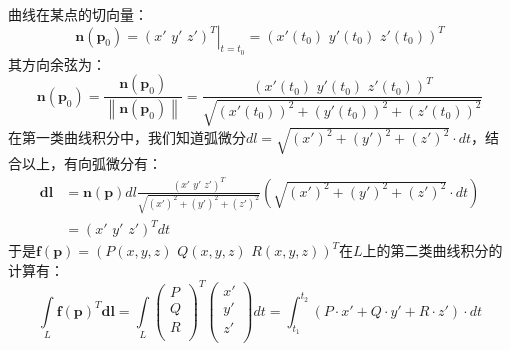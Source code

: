 \begin{theorem}[第二类曲线积分的计算公式]
曲线在某点的切向量：
\[
\boldsymbol{n}\left( \boldsymbol{p}_0 \right) =\left. \left( x'\,\,y'\,\,z' \right) ^T \right|_{t=t_0}=\left( x'\left( t_0 \right) \,\,y'\left( t_0 \right) \,\,z'\left( t_0 \right) \right) ^T
\]
其方向余弦为：
\[
\mathbf{n}\left( \boldsymbol{p}_0 \right) =\frac{\boldsymbol{n}\left( \boldsymbol{p}_0 \right)}{\left\| \boldsymbol{n}\left( \boldsymbol{p}_0 \right) \right\|} =\frac{\left( x'\left( t_0 \right) \,\,y'\left( t_0 \right) \,\,z'\left( t_0 \right) \right) ^T}{\sqrt{\left( x'\left( t_0 \right) \right) ^2+\left( y'\left( t_0 \right) \right) ^2+\left( z'\left( t_0 \right) \right) ^2}}
\]
在第一类曲线积分中，我们知道弧微分$dl=\sqrt{\left( x' \right) ^2+\left( y' \right) ^2+\left( z' \right) ^2}\cdot dt$，结合以上，有向弧微分有：
\begin{align*}
\boldsymbol{dl}&=\mathbf{n}\left( \boldsymbol{p} \right) dl \frac{\left( x'\,\,y'\,\,z' \right) ^T}{\sqrt{\left( x' \right) ^2+\left( y' \right) ^2+\left( z' \right) ^2}} \left( \sqrt{\left( x' \right) ^2+\left( y' \right) ^2+\left( z' \right) ^2}\cdot dt \right) \\
&=\left( x'\,\,y'\,\,z' \right) ^Tdt
\end{align*}
于是$\boldsymbol{f}\left( \boldsymbol{p} \right) =\left( P\left( x,y,z \right) \,\,Q\left( x,y,z \right) \,\,R\left( x,y,z \right) \right) ^T$在$L$上的第二类曲线积分的计算有：
\[
\int\limits_L{\boldsymbol{f}\left( \boldsymbol{p} \right) ^T\boldsymbol{dl}}=\int\limits_L{\left( \begin{array}{c}
	P\\
	Q\\
	R\\
\end{array} \right) ^T\left( \begin{array}{c}
	x'\\
	y'\\
	z'\\
\end{array} \right) dt} =\int_{t_1}^{t_2}{\left( P\cdot x'+Q\cdot y'+R\cdot z' \right) \cdot dt}
\]
\end{theorem}

